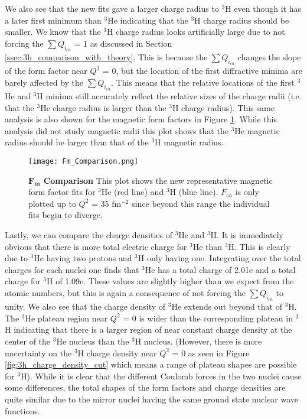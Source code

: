 We also see that the new fits gave a larger charge radius to $^3$H even though it has a later first minimum than $^3$He indicating that the $^3$H charge radius should be smaller. We know that the $^3$H charge radius looks artificially large due to not forcing the $\sum Q_{i_{ch}}$ = 1 as discussed in Section \ref{ssec:3h_comparison_with_theory}. This is because the $\sum Q_{i_{ch}}$ changes the slope of the form factor near $Q^2$ = 0, but the location of the first diffractive minima are barely affected by the $\sum Q_{i_{ch}}$. This means that the relative locations of the first $^3$He and $^3$H minima still accurately reflect the relative sizes of the charge radii (i.e. that the $^3$He charge radius is larger than the $^3$H charge radius). This same analysis is also shown for the magnetic form factors in Figure \ref{fig:fm_comparison}. While this analysis did not study magnetic radii this plot shows that the $^3$He magnetic radius should be larger than that of the $^3$H magnetic radius.

\begin{figure}[!ht]
	\begin{center}
	\texttt{[image: Fm\_Comparison.png]}
	\end{center}
	\caption[$F_{m}$ Comparison]{
	{\bf{$\boldsymbol{F_{m}}$ Comparison}} This plot shows the new representative magnetic form factor fits for $^3$He (red line) and $^3$H (blue line). $F_{ch}$ is only plotted up to $Q^2$ = 35 fm$^{-2}$ since beyond this range the individual fits begin to diverge.}
	\label{fig:fm_comparison}
\end{figure}

Lastly, we can compare the charge densities of $^3$He and $^3$H. It is immediately obvious that there is more total electric charge for $^3$He than $^3$H. This is clearly due to $^3$He having two protons and $^3$H only having one. Integrating over the total charges for each nuclei one finds that $^3$He has a total charge of 2.01e and a total charge for $^3$H of 1.09e. These values are slightly higher than we expect from the atomic numbers, but this is again a consequence of not forcing the $\sum Q_{i_{ch}}$ to unity. We also see that the charge density of $^3$He extends out beyond that of $^3$H. The $^3$He plateau region near $Q^2$ = 0 is wider than the corresponding plateau in $^3$H indicating that there is a larger region of near constant charge density at the center of the $^3$He nucleus than the $^3$H nucleus. (However, there is more uncertainty on the $^3$H charge density near $Q^2$ = 0 as seen in Figure \ref{fig:3h_charge_density_cut} which means a range of plateau shapes are possible for $^3$H). While it is clear that the different Coulomb forces in the two nuclei cause some differences, the total shapes of the form factors and charge densities are quite similar due to the mirror nuclei having the same ground state nuclear wave functions. 

